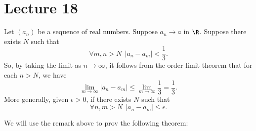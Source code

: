 

\section{Lecture 18}

 \begin{remark}\label{Useful Observation}
    Let \( ({a}_{n}) \) be a sequence of real numbers. Suppose \( {a}_{n} \to a  \) in \( \R  \). Suppose there exists \( N \) such that  
    \[  \forall m, n > N  \ \ | {a}_{n} - {a}_{m} | < \frac{ 1 }{ 3 }. \]
    So, by taking the limit as \( n \to \infty   \), it follows from the order limit theorem that for each \( n > N  \), we have 
    \[  \lim_{ m \to \infty  }  | {a}_{n} - {a}_{m} |  \leq \lim_{ m \to \infty  }  \frac{ 1 }{ 3 } = \frac{ 1 }{ 3 }. \]
    More generally, given \( \epsilon > 0  \), if there exists \( N  \) such that
    \[  \forall n,m > N \ \ | {a}_{n} - {a}_{m} |  \leq \epsilon. \]
 \end{remark}

 We will use the remark above to prov the following theorem: 

